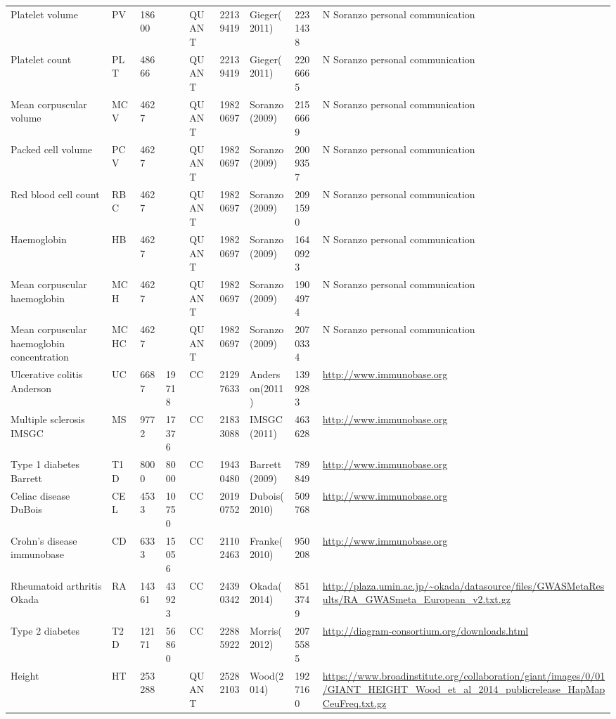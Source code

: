 \begin{center}
\begin{longtable}{| L{5cm} | C{1.5cm} | C{1cm} | C{1.5cm} | C{1.5cm} | C{1.5cm} | L{2.5cm} | R{1.5cm} | L{4cm} |}
Platelet volume & PV & 18600 &  & QUANT & 22139419 & Gieger(2011) & 2231438  & N Soranzo personal communication \\
Platelet count & PLT & 48666 &  & QUANT & 22139419 & Gieger(2011) & 2206665  & N Soranzo personal communication \\
Mean corpuscular volume & MCV & 4627 &  & QUANT & 19820697 & Soranzo(2009) & 2156669  & N Soranzo personal communication \\
Packed cell volume & PCV & 4627 &  & QUANT & 19820697 & Soranzo(2009) & 2009357  & N Soranzo personal communication \\
Red blood cell count & RBC & 4627 &  & QUANT & 19820697 & Soranzo(2009) & 2091590  & N Soranzo personal communication \\
Haemoglobin & HB & 4627 &  & QUANT & 19820697 & Soranzo(2009) & 1640923  & N Soranzo personal communication \\
Mean corpuscular haemoglobin & MCH & 4627 &  & QUANT & 19820697 & Soranzo(2009) & 1904974  & N Soranzo personal communication \\
Mean corpuscular haemoglobin concentration & MCHC & 4627 &  & QUANT & 19820697 & Soranzo(2009) & 2070334  & N Soranzo personal communication \\
Ulcerative colitis Anderson & UC & 6687 & 19718 & CC & 21297633 & Anderson(2011) & 1399283  & \url{http://www.immunobase.org} \\
Multiple sclerosis IMSGC & MS & 9772 & 17376 & CC & 21833088 & IMSGC(2011) & 463628  & \url{http://www.immunobase.org} \\
Type 1 diabetes Barrett & T1D & 8000 & 8000 & CC & 19430480 & Barrett(2009) & 789849  & \url{http://www.immunobase.org} \\
Celiac disease DuBois & CEL & 4533 & 10750 & CC & 20190752 & Dubois(2010) & 509768  & \url{http://www.immunobase.org} \\
Crohn's disease immunobase & CD & 6333 & 15056 & CC & 21102463 & Franke(2010) & 950208  & \url{http://www.immunobase.org} \\
Rheumatoid arthritis Okada & RA & 14361 & 43923 & CC & 24390342 & Okada(2014) & 8513749  & \url{http://plaza.umin.ac.jp/\~okada/datasource/files/GWASMetaResults/RA\_GWASmeta\_European\_v2.txt.gz} \\
Type 2 diabetes & T2D & 12171 & 56860 & CC & 22885922 & Morris(2012) & 2075585  & \url{http://diagram-consortium.org/downloads.html} \\
Height & HT & 253288 &  & QUANT & 25282103 & Wood(2014) & 1927160  & \url{https://www.broadinstitute.org/collaboration/giant/images/0/01/GIANT\_HEIGHT\_Wood\_et\_al\_2014\_publicrelease\_HapMapCeuFreq.txt.gz} \\

\end{longtable}
\end{center}
